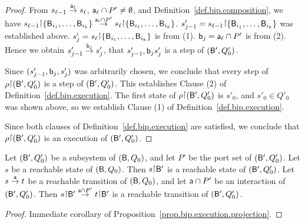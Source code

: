 \begin{proof}
From $s_{\l-1} \goestog[\act_{\l}] s_{\l}$,    $\act_{\l} \ints P' \ne \emptyset$, and Definition~\ref{def.bip.composition}, we have  %
        $s_{\l-1} \pj \set{\B_{i_1},\dots,\B_{i_k}} \goestog[\act_{\l} \ints P'] s_{\l} \pj \set{\B_{i_1},\dots,\B_{i_k}}$.
$s'_{j-1} = s_{\l-1} \pj \set{\B_{i_1},\dots,\B_{i_k}}$ was established above.
$s'_j = s_{\l} \pj \set{\B_{i_1},\dots,\B_{i_k}}$ is from (1).
$\actb_j = \act_{\l} \ints P'$ is from (2).
Hence we obtain $s'_{j-1} \goestog[\actb_j] s'_j$, \ie that $s'_{j-1}, \actb_j s'_j$ is a step of  $(\B', Q'_0)$.

Since $(s'_{j-1}, \actb_j, s'_j)$ was arbitrarily chosen, we conclude that
every step of $\rho \pj (\B', Q'_0)$  is a step of $(\B', Q'_0)$. This establishes Clause (2) of Definition~\ref{def.bip.execution}.
%
The first state of
$\rho \pj (\B', Q'_0)$  is $s'_0$, and $s'_0 \in Q'_0$ was shown above, so we establish Clause (1) of Definition~\ref{def.bip.execution}.

Since both clauses of Definition~\ref{def.bip.execution} are satisfied, we conclude that $\rho \pj (\B', Q'_0)$ is an execution of $(\B', Q'_0)$.
\end{proof}


\begin{corollary} \label{cor.bip.reachability} \label{cor:bip.reachability}
Let $(\B', Q'_0)$ be a subsystem of $(\B, Q_0)$, and let $P'$ be the port set of $(\B', Q'_0)$.
Let $s$ be a reachable state of $(\B, Q_0)$. Then $s \pj \B'$ is a reachable state of  $(\B',Q'_0)$. Let $s \la{\act} t$ be
a reachable transition of $(\B, Q_0)$, and let $\act \ints P'$ be an interaction of
 $(\B', Q'_0)$. Then  $s \pj \B' \la{\act \ints P'} t \pj \B'$ is a reachable transition of $(\B', Q'_0)$.
\end{corollary}
%
\begin{proof}
Immediate corollary of Proposition~\ref{prop.bip.execution.projection}.
\end{proof}



